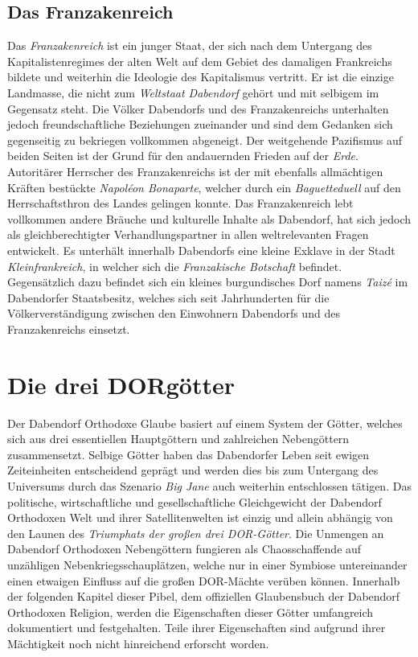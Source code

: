 \subsection{{Das Franzakenreich}}
Das \textit{Franzakenreich} ist ein junger Staat, der sich nach dem Untergang des Kapitalistenregimes der alten Welt auf dem Gebiet des damaligen Frankreichs bildete und weiterhin die Ideologie des Kapitalismus vertritt. Er ist die einzige Landmasse, die nicht zum \textit{Weltstaat Dabendorf} gehört und mit selbigem im Gegensatz steht. Die Völker Dabendorfs und des Franzakenreichs unterhalten jedoch freundschaftliche Beziehungen zueinander und sind dem Gedanken sich gegenseitig zu bekriegen vollkommen abgeneigt. Der weitgehende Pazifismus auf beiden Seiten ist der Grund für den andauernden Frieden auf der \textit{Erde}. Autoritärer Herrscher des Franzakenreichs ist der mit ebenfalls allmächtigen Kräften bestückte \textit{Napoléon Bonaparte}, welcher durch ein \textit{Baguetteduell} auf den Herrschaftsthron des Landes gelingen konnte. Das Franzakenreich lebt vollkommen andere Bräuche und kulturelle Inhalte als Dabendorf, hat sich jedoch als gleichberechtigter Verhandlungspartner in allen weltrelevanten Fragen entwickelt. Es unterhält innerhalb Dabendorfs eine kleine Exklave in der Stadt \textit{Kleinfrankreich}, in welcher sich die \textit{Franzakische Botschaft} befindet. Gegensätzlich dazu befindet sich ein kleines burgundisches Dorf namens \textit{Taizé} im Dabendorfer Staatsbesitz, welches sich seit Jahrhunderten für die Völkerverständigung zwischen den Einwohnern Dabendorfs und des Franzakenreichs einsetzt.

\section{{Die drei DORgötter}}
Der Dabendorf Orthodoxe Glaube basiert auf einem System der Götter, welches sich aus drei essentiellen Hauptgöttern und zahlreichen Nebengöttern zusammensetzt. Selbige Götter haben das Dabendorfer Leben seit ewigen Zeiteinheiten entscheidend geprägt und werden dies bis zum Untergang des Universums durch das Szenario \textit{Big Jane} auch weiterhin entschlossen tätigen. Das politische, wirtschaftliche und gesellschaftliche Gleichgewicht der Dabendorf Orthodoxen Welt und ihrer Satellitenwelten ist einzig und allein abhängig von den Launen des \textit{Triumphats der großen drei DOR-Götter}. Die Unmengen an Dabendorf Orthodoxen Nebengöttern fungieren als Chaosschaffende auf unzähligen Nebenkriegsschauplätzen, welche nur in einer Symbiose untereinander einen etwaigen Einfluss auf die großen DOR-Mächte verüben können. Innerhalb der folgenden Kapitel dieser Pibel, dem offiziellen Glaubensbuch der Dabendorf Orthodoxen Religion, werden die Eigenschaften dieser Götter umfangreich dokumentiert und festgehalten. Teile ihrer Eigenschaften sind aufgrund ihrer Mächtigkeit noch nicht hinreichend erforscht worden.
\clearpage
